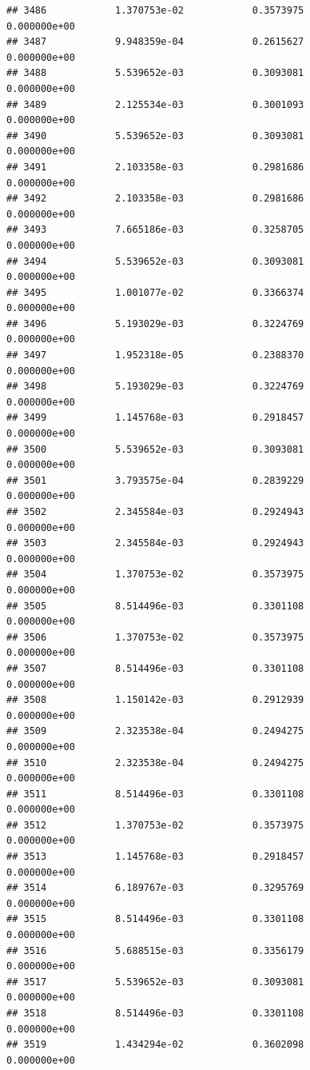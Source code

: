 \documentclass[
]{article}
\begin{document}
\begin{verbatim}
## 3486            1.370753e-02            0.3573975            0.000000e+00
## 3487            9.948359e-04            0.2615627            0.000000e+00
## 3488            5.539652e-03            0.3093081            0.000000e+00
## 3489            2.125534e-03            0.3001093            0.000000e+00
## 3490            5.539652e-03            0.3093081            0.000000e+00
## 3491            2.103358e-03            0.2981686            0.000000e+00
## 3492            2.103358e-03            0.2981686            0.000000e+00
## 3493            7.665186e-03            0.3258705            0.000000e+00
## 3494            5.539652e-03            0.3093081            0.000000e+00
## 3495            1.001077e-02            0.3366374            0.000000e+00
## 3496            5.193029e-03            0.3224769            0.000000e+00
## 3497            1.952318e-05            0.2388370            0.000000e+00
## 3498            5.193029e-03            0.3224769            0.000000e+00
## 3499            1.145768e-03            0.2918457            0.000000e+00
## 3500            5.539652e-03            0.3093081            0.000000e+00
## 3501            3.793575e-04            0.2839229            0.000000e+00
## 3502            2.345584e-03            0.2924943            0.000000e+00
## 3503            2.345584e-03            0.2924943            0.000000e+00
## 3504            1.370753e-02            0.3573975            0.000000e+00
## 3505            8.514496e-03            0.3301108            0.000000e+00
## 3506            1.370753e-02            0.3573975            0.000000e+00
## 3507            8.514496e-03            0.3301108            0.000000e+00
## 3508            1.150142e-03            0.2912939            0.000000e+00
## 3509            2.323538e-04            0.2494275            0.000000e+00
## 3510            2.323538e-04            0.2494275            0.000000e+00
## 3511            8.514496e-03            0.3301108            0.000000e+00
## 3512            1.370753e-02            0.3573975            0.000000e+00
## 3513            1.145768e-03            0.2918457            0.000000e+00
## 3514            6.189767e-03            0.3295769            0.000000e+00
## 3515            8.514496e-03            0.3301108            0.000000e+00
## 3516            5.688515e-03            0.3356179            0.000000e+00
## 3517            5.539652e-03            0.3093081            0.000000e+00
## 3518            8.514496e-03            0.3301108            0.000000e+00
## 3519            1.434294e-02            0.3602098            0.000000e+00

\end{verbatim}
\end{document}
